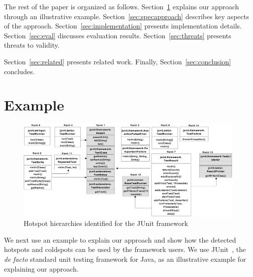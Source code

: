 \documentclass[conference]{IEEEtran}
\newcommand{\Comment}[1]{}
\begin{document}
The rest of the paper is organized as follows. 
Section~\ref{sec:example} explains our approach through an illustrative example.
Section~\ref{sec:specapproach} describes key aspects of the approach.
Section~\ref{sec:implementation} presents implementation details.
Section~\ref{sec:eval} discusses evaluation results.
Section~\ref{sec:threats} presents threats to validity.
\Comment{Section~\ref{sec:discussion} presents limitations and future work.}
Section~\ref{sec:related} presents related work.
Finally, Section~\ref{sec:conclusion} concludes.

\section{Example}
\label{sec:example}

\begin{figure}[t]
\centering
\includegraphics[scale=0.68,clip]{examplehotspot_final.eps}
\caption{Hotspot hierarchies identified for the JUnit framework} \label{fig:hotspotexample}
\end{figure}

We next use an example to explain our approach and show how the detected
hotspots and coldspots can be used by the framework users. We use JUnit~\cite{JUNIT}, the
\emph{de facto} standard unit testing framework for Java, 
as an illustrative example for explaining our approach.
\end{document}
